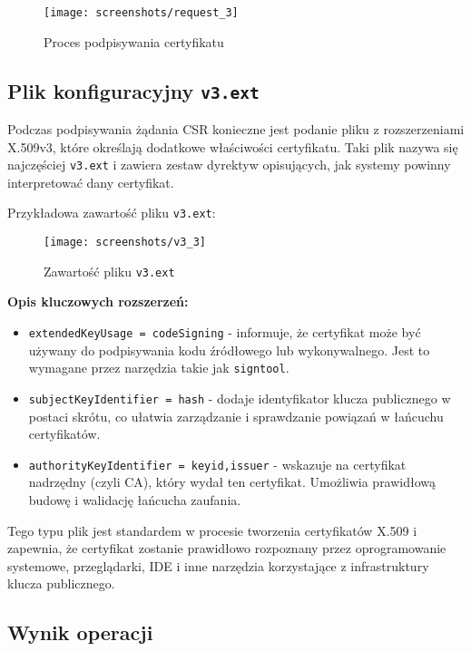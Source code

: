 \documentclass{article}
\begin{document}
\begin{figure}[H]
    \centering
    \texttt{[image: screenshots/request\_3]}
    \caption{Proces podpisywania certyfikatu}
    \label{fig:signing_process}
\end{figure}

\subsection{Plik konfiguracyjny \texttt{v3.ext}}

Podczas podpisywania żądania CSR konieczne jest podanie pliku z rozszerzeniami X.509v3, które określają dodatkowe właściwości certyfikatu. Taki plik nazywa się najczęściej \texttt{v3.ext} i zawiera zestaw dyrektyw opisujących, jak systemy powinny interpretować dany certyfikat.

\noindent Przykładowa zawartość pliku \texttt{v3.ext}:

\begin{figure}[H]
    \centering
    \texttt{[image: screenshots/v3\_3]}
    \caption{Zawartość pliku \texttt{v3.ext}}
    \label{fig:v3_content}
\end{figure}

\noindent\textbf{Opis kluczowych rozszerzeń:}
\begin{itemize}
    \item \texttt{extendedKeyUsage = codeSigning} - informuje, że certyfikat może być używany do podpisywania kodu źródłowego lub wykonywalnego. Jest to wymagane przez narzędzia takie jak \texttt{signtool}.
    \item \texttt{subjectKeyIdentifier = hash} - dodaje identyfikator klucza publicznego w postaci skrótu, co ułatwia zarządzanie i sprawdzanie powiązań w łańcuchu certyfikatów.
    \item \texttt{authorityKeyIdentifier = keyid,issuer} - wskazuje na certyfikat nadrzędny (czyli CA), który wydał ten certyfikat. Umożliwia prawidłową budowę i walidację łańcucha zaufania.
\end{itemize}

\noindent Tego typu plik jest standardem w procesie tworzenia certyfikatów X.509 i zapewnia, że certyfikat zostanie prawidłowo rozpoznany przez oprogramowanie systemowe, przeglądarki, IDE i inne narzędzia korzystające z infrastruktury klucza publicznego. \\

\subsection{Wynik operacji}
\end{document}
